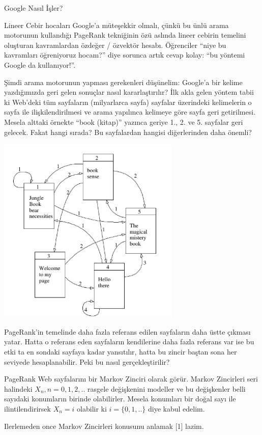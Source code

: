\documentclass[12pt,fleqn]{article}\usepackage{../../common}
\begin{document}
Google Nasıl İşler? 

Lineer Cebir hocaları Google'a müteşekkir olmalı, çünkü bu ünlü arama
motorunun kullandığı PageRank tekniğinin özü aslında lineer cebirin
temelini oluşturan kavramlardan özdeğer / özvektör hesabı. Öğrenciler
``niye bu kavramları öğreniyoruz hocam?''  diye sorunca artık cevap
kolay: ``bu yöntemi Google da kullanıyor!''.

Şimdi arama motorunun yapması gerekenleri düşünelim: Google'a bir kelime
yazdığımızda geri gelen sonuçlar nasıl kararlaştırılır? İlk akla gelen
yöntem tabii ki Web'deki tüm sayfaların (milyarlarca sayfa) sayfalar
üzerindeki kelimelerin o sayfa ile ilişkilendirilmesi ve arama yapılınca
kelimeye göre sayfa geri getirilmesi. Mesela alttaki örnekte ``book
(kitap)'' yazınca geriye 1., 2. ve 5. sayfalar geri gelecek. Fakat hangi
sırada? Bu sayfalardan hangisi diğerlerinden daha önemli?

\includegraphics[height=9cm]{pg2.png}

PageRank'in temelinde daha fazla referans edilen sayfaların daha üstte
çıkması yatar. Hatta o referans eden sayfaların kendilerine daha fazla
referans var ise bu etki ta en sondaki sayfaya kadar yansıtılır, hatta bu
zincir baştan sona her seviyede hesaplanabilir. Peki bu nasıl
gerçekleştirilir?

PageRank Web sayfalarını bir Markov Zinciri olarak görür. Markov Zincirleri
seri halindeki $X_n, n=0,1,2,..$ rasgele değişkenini modeller ve bu
değişkenler belli sayıdaki konumların birinde olabilirler. Mesela konumları
bir doğal sayı ile ilintilendirirsek $X_n = i$ olabilir ki $i=\{0,1,..\}$
diye kabul edelim.

Ilerlemeden once Markov Zincirleri konusunu anlamak [1] lazim.
\end{document}

